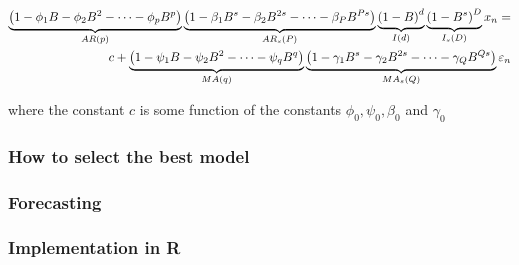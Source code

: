 \begin{align}
\underbrace{\left(1-\phi_1 B-\phi_2B^2-\dots-\phi_p B^p\right)}_{AR(p)}
\underbrace{\left(1-\beta_1 B^s-\beta_2B^{2s}-\dots-\beta_P B^{Ps}\right)}_{AR_s(P)} 
\underbrace{\left(1-B\right)^d}_{I(d)}\underbrace{\left(1-B^s\right)^D}_{I_s(D)}   x_n = \nonumber \\
 c+
\underbrace{\left(1-\psi_1 B-\psi_2B^2-\dots-\psi_q B^q\right)}_{MA(q)}
\underbrace{\left(1-\gamma_1 B^s-\gamma_2B^{2s}-\dots-\gamma_Q B^{Qs}\right)}_{MA_s(Q)} \varepsilon_n
\end{align}

where the constant $c$ is some function of the constants $\phi_0,\psi_0,\beta_0$ and $\gamma_0$ 

\subsubsection{How to select the best model}

\subsubsection{Forecasting}

\subsubsection{Implementation in R}

